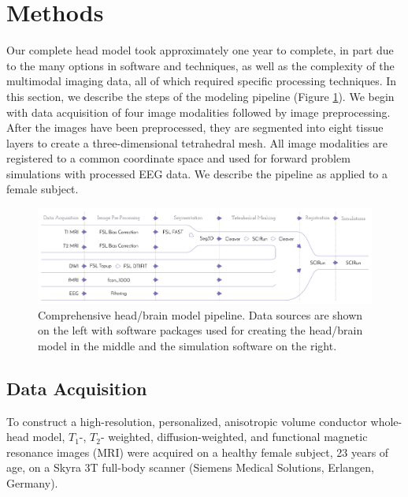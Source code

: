 
\section{Methods}
\label{sec:Methods}

Our complete head model took approximately one year to complete, in part due to the many options in software and techniques, as well as the complexity of the multimodal imaging data, all of which required specific processing techniques. In this section, we describe the steps of the modeling pipeline (Figure \ref{fig:pipeline}). We begin with data acquisition of four image modalities followed by image preprocessing. After the images have been preprocessed, they are segmented into eight tissue layers to create a three-dimensional tetrahedral mesh. All image modalities are registered to a common coordinate space and used for forward problem simulations with processed EEG data. We describe the pipeline as applied to a female subject. 

\begin{figure}[H]
    \centering
    \includegraphics[width=\textwidth]{Figures/pipeline}
    \caption{Comprehensive head/brain model pipeline. Data sources are shown on the left with software packages used for creating the head/brain model in the middle and the simulation software on the right.}
    \label{fig:pipeline}
\end{figure}

\subsection{Data Acquisition}
\label{sec:Data}


To construct a high-resolution, personalized, anisotropic volume conductor whole-head model, $T_1$-, $T_2$- weighted, diffusion-weighted, and functional magnetic resonance images (MRI) were acquired on a healthy female subject, 23 years of age, on a Skyra 3T full-body scanner (Siemens Medical Solutions, Erlangen, Germany).

